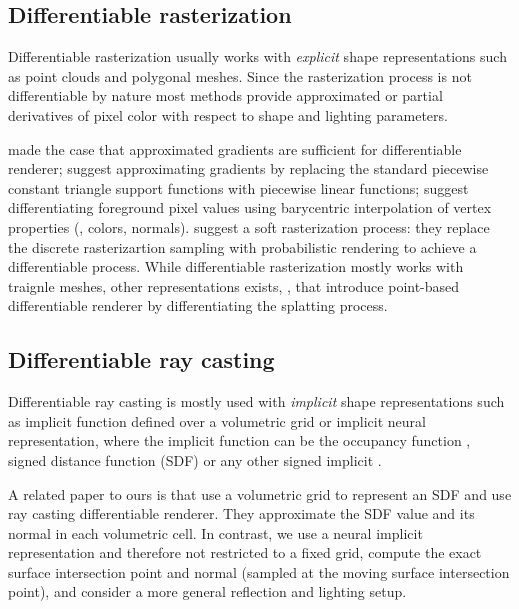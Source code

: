 \documentclass[runningheads]{llncs}
\begin{document}
\subsection{Differentiable rasterization}
Differentiable rasterization usually works with \emph{explicit} shape representations such as point clouds and polygonal meshes. Since the rasterization process is not differentiable by nature most methods provide approximated or partial derivatives of pixel color with respect to shape and lighting parameters.  

\cite{loper2014opendr} made the case that approximated gradients are sufficient for differentiable renderer; \cite{kato2018neural} suggest approximating gradients by replacing the standard piecewise constant triangle support functions with piecewise linear functions; \cite{genova2018unsupervised,chen2019learning} suggest differentiating foreground pixel values using barycentric interpolation of vertex properties (\eg, colors, normals). \cite{liu2019soft_a,liu2019soft_b} suggest a soft rasterization process: they replace the discrete rasterizartion sampling with probabilistic rendering to achieve a differentiable process. While differentiable rasterization mostly works with traignle meshes, other representations exists, \eg, \cite{yifan2019differentiable} that introduce point-based differentiable renderer by differentiating the splatting process. 


\subsection{Differentiable ray casting}
Differentiable ray casting is mostly used with \emph{implicit} shape representations such as implicit function defined over a volumetric grid or implicit neural representation, where the implicit function can be the occupancy function \cite{mescheder2019occupancy,chen2019learningimplicit}, signed distance function (SDF) \cite{park2019deepsdf} or any other signed implicit \cite{atzmon2019sal}. 

A related paper to ours is \cite{jiang2019sdfdiff} that use a volumetric grid to represent an SDF and use ray casting differentiable renderer. They approximate the SDF value and its normal in each volumetric cell. In contrast, we use a neural implicit representation and therefore not restricted to a fixed grid, compute the exact surface intersection point and normal (sampled at the moving surface intersection point), and consider a more general reflection and lighting setup. 
\end{document}
